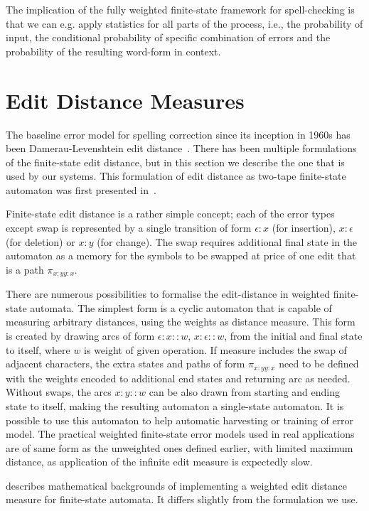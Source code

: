 \documentclass[officiallayout]{unihelcompling}
\begin{document}
The implication of the fully weighted finite-state framework for spell-checking
is that we can e.g. apply statistics for all parts of the process, i.e.,
the probability of input, the conditional probability of specific
combination of errors and the probability of the resulting word-form in 
context. 

\section{Edit Distance Measures}
\label{sec:edit-distance}

The baseline error model for spelling correction since its inception in 1960s
has been Damerau-Levenshtein edit
distance~\citep{damerau1964technique,levenshtein1966binary}. There has been
multiple formulations of the finite-state edit distance, but in this section
we describe the one that is used by our systems. This formulation of
edit distance as two-tape finite-state automaton was first presented 
in~\citet{schulz2002fast}.

Finite-state edit distance is a rather simple concept; each of the error types
except swap is represented by a single transition of form $\epsilon:x$ (for
insertion), $x:\epsilon$ (for deletion) or $x:y$ (for change). The swap
requires additional final state in the automaton as a memory for the symbols to
be swapped at price of one edit that is a path $\pi_{x:y y:x}$.

There are numerous possibilities to formalise the edit-distance in weighted
finite-state automata. The simplest form is a cyclic automaton that is
capable of measuring arbitrary distances, using the weights as distance 
measure. This form is created by drawing arcs of form $\epsilon:x::w$,
$x:\epsilon::w$, from the initial and final state to itself, 
where $w$ is weight of given operation. If measure includes the swap of 
adjacent characters, the extra states and paths of form $\pi_{x:y y:x}$ need to
be defined with the weights encoded to additional end states and returning arc
as needed. Without swaps, the arcs $x:y::w$ can be also drawn from starting
and ending state to itself, making the resulting automaton a single-state
automaton. It is possible to use this automaton to help automatic harvesting
or training of error model. The practical weighted finite-state error models
used in real applications are of same form as the unweighted ones defined
earlier, with limited maximum distance, as application of the infinite edit
measure is expectedly slow.

\citet{mohri2003edit} describes mathematical backgrounds of
implementing a weighted edit distance measure for finite-state automata. It
differs slightly from the formulation we use.
\end{document}
